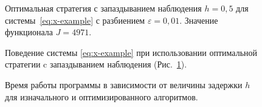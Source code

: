 \begin{figure}[bh]
        \noindent{}
        \caption{Оптимальная стратегия с запаздыванием наблюдения $h = 0,\!5$ для системы~\eqref{eq:x-example} с разбиением $\varepsilon = 0,\!01$. Значение функционала $J = 4971$.}
        \label{img:small-control}
\end{figure}
\begin{figure}[bh]
        \noindent{}
        \caption{Поведение системы \eqref{eq:x-example} при использовании оптимальной стратегии c запаздыванием наблюдения (Рис.~\ref{img:small-control}).}
        \label{img:small-tr}
\end{figure}
\begin{figure}[bh]
        \noindent{}
        \caption{Время работы программы в зависимости от величины задержки $h$ для изначального и оптимизированного алгоритмов.}
        \label{img:cpu}
\end{figure}